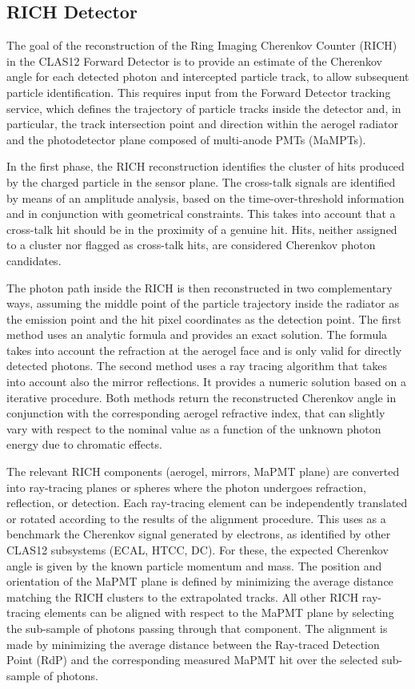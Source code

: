 \subsection{RICH Detector}

The goal of the reconstruction of the Ring Imaging Cherenkov Counter (RICH)~\cite{rich-nim} in the CLAS12
Forward Detector is to provide an estimate of the Cherenkov angle for each detected photon and intercepted
particle track, to allow subsequent particle identification. This requires input from the Forward Detector tracking
service, which  defines the trajectory of particle tracks inside the detector and, in particular, the track
intersection point and direction within the aerogel radiator and the photodetector plane composed of multi-anode
PMTs (MaMPTs). 

In the first phase, the RICH reconstruction identifies the cluster of hits produced by the charged particle in
the sensor plane. The cross-talk signals are identified by means of an amplitude analysis, based on the
time-over-threshold information and in conjunction with geometrical constraints. This takes into account that a
cross-talk hit should be in the proximity of a genuine hit. Hits, neither assigned to a cluster nor flagged as
cross-talk hits, are considered Cherenkov photon candidates. 

The photon path inside the RICH is then reconstructed in two complementary ways, assuming the middle point of
the particle trajectory inside the radiator as the emission point and the hit pixel coordinates as the detection
point. The first method uses an analytic formula and provides an exact solution. The formula takes into account
the refraction at the aerogel face and is only valid for directly detected photons. The second method uses a ray
tracing algorithm that takes into account also the mirror reflections. It provides a numeric solution based on a
iterative procedure. Both methods return the reconstructed Cherenkov angle in conjunction with the corresponding
aerogel refractive index, that can slightly vary with respect to the nominal value as a function of the unknown photon
energy due to chromatic effects. 

The relevant RICH components (aerogel, mirrors, MaPMT plane) are converted into ray-tracing planes or spheres
where the photon undergoes refraction, reflection, or detection. Each ray-tracing element can be independently
translated or rotated according to the results of the alignment procedure. This uses as a benchmark the Cherenkov
signal generated by electrons, as identified by other CLAS12 subsystems (ECAL, HTCC, DC). For these, the
expected Cherenkov angle is given by the known particle momentum and mass. The position and orientation of the
MaPMT plane is defined by minimizing the average distance matching the RICH clusters to the extrapolated tracks.
All other RICH ray-tracing elements can be aligned with respect to the MaPMT plane by selecting the sub-sample of
photons passing through that component. The alignment is made by minimizing the average distance between the
Ray-traced Detection Point (RdP) and the corresponding measured MaPMT hit over the selected sub-sample of
photons.

